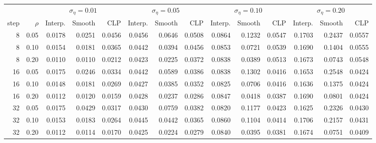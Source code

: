 \begin{tabular}{rrrrrrrrrrrrrr}
\toprule
& & \multicolumn{3}{c}{$\sigma_{\eta}=0.01$} & \multicolumn{3}{c}{$\sigma_{\eta}=0.05$} & \multicolumn{3}{c}{$\sigma_{\eta}=0.10$} & \multicolumn{3}{c}{$\sigma_{\eta}=0.20$} \\
\cmidrule(lr){3-5} \cmidrule(lr){6-8} \cmidrule(lr){9-11} \cmidrule(lr){12-14}
step & $\rho$ & Interp. & Smooth & CLP & Interp. & Smooth & CLP & Interp. & Smooth & CLP & Interp. & Smooth & CLP \\
\midrule
8 & 0.05 & 0.0178 & 0.0251 & 0.0456 & 0.0456 & 0.0646 & 0.0508 & 0.0864 & 0.1232 & 0.0547 & 0.1703 & 0.2437 & 0.0557 \\
8 & 0.10 & 0.0154 & 0.0181 & 0.0365 & 0.0442 & 0.0394 & 0.0456 & 0.0853 & 0.0721 & 0.0539 & 0.1690 & 0.1404 & 0.0555 \\
8 & 0.20 & 0.0110 & 0.0110 & 0.0212 & 0.0423 & 0.0225 & 0.0372 & 0.0838 & 0.0389 & 0.0513 & 0.1673 & 0.0743 & 0.0548 \\
16 & 0.05 & 0.0175 & 0.0246 & 0.0334 & 0.0442 & 0.0589 & 0.0386 & 0.0838 & 0.1302 & 0.0416 & 0.1653 & 0.2548 & 0.0424 \\
16 & 0.10 & 0.0148 & 0.0181 & 0.0269 & 0.0427 & 0.0385 & 0.0352 & 0.0825 & 0.0706 & 0.0416 & 0.1636 & 0.1375 & 0.0424 \\
16 & 0.20 & 0.0112 & 0.0120 & 0.0159 & 0.0428 & 0.0237 & 0.0286 & 0.0847 & 0.0418 & 0.0387 & 0.1690 & 0.0801 & 0.0424 \\
32 & 0.05 & 0.0175 & 0.0429 & 0.0317 & 0.0430 & 0.0759 & 0.0382 & 0.0820 & 0.1177 & 0.0423 & 0.1625 & 0.2326 & 0.0430 \\
32 & 0.10 & 0.0153 & 0.0183 & 0.0264 & 0.0445 & 0.0442 & 0.0365 & 0.0860 & 0.1104 & 0.0414 & 0.1706 & 0.2157 & 0.0431 \\
32 & 0.20 & 0.0112 & 0.0114 & 0.0170 & 0.0425 & 0.0224 & 0.0279 & 0.0840 & 0.0395 & 0.0381 & 0.1674 & 0.0751 & 0.0409 \\
\bottomrule
\end{tabular}
